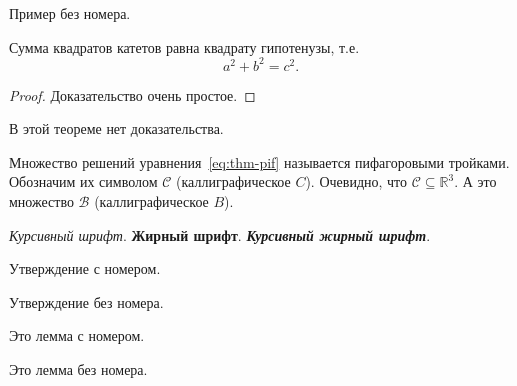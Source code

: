 \documentclass[colorthm]{../civarticle}
\begin{document}
\blinditemize%

\blindenumerate%

\blinddescription%

\begin{example*}
  Пример без номера.
  \Blindtext[2]
\end{example*}

\Blindtext[2]

\begin{theorem}
  Сумма квадратов катетов равна квадрату гипотенузы, т.е.
  \begin{equation}
    \label{eq:thm-pif}
    a^2+b^2=c^2.
  \end{equation}
\end{theorem}
\begin{proof}
  Доказательство очень простое.
\end{proof}

\begin{theorem}\label{thm:example:noproof}
  В этой теореме нет доказательства.
  \Blindtext[2]
\end{theorem}

\Blindtext[2]

Множество решений уравнения~\eqref{eq:thm-pif} называется пифагоровыми
тройками.  Обозначим их символом $\mathcal{C}$ (каллиграфическое $C$).
Очевидно, что $\mathcal{C}\subseteq \mathbb{R}^{3}$.  А это множество
$\mathcal{B}$ (каллиграфическое $B$).

\textit{Курсивный шрифт}.  \textbf{Жирный шрифт}.
\textit{\textbf{Курсивный жирный шрифт}}.


\begin{proposition}\label{prop:example:numbered}
  Утверждение с номером.
  \Blindtext[2]
\end{proposition}

\begin{proposition*}
  Утверждение без номера.
  \Blindtext[2]
\end{proposition*}

\Blindtext[2]

\begin{lemma}\label{lem:example:numbered}
  Это лемма с номером.
  \Blindtext[2]
\end{lemma}

\begin{lemma*}
  Это лемма без номера.
  \Blindtext[2]
\end{lemma*}
\end{document}
